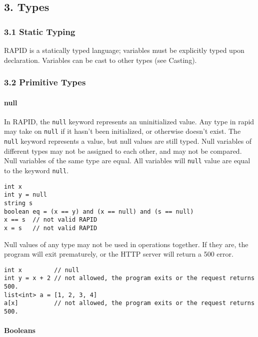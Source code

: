 \documentclass[]{article}
\begin{document}
\subsection{3. Types}\label{types}

\subsubsection{3.1 Static Typing}\label{static-typing}

RAPID is a statically typed language; variables must be explicitly typed
upon declaration. Variables can be cast to other types (see Casting).

\subsubsection{3.2 Primitive Types}\label{primitive-types}

\paragraph{null}\label{null}

In RAPID, the \texttt{null} keyword represents an uninitialized value.
Any type in rapid may take on \texttt{null} if it hasn't been
initialized, or otherwise doesn't exist. The \texttt{null} keyword
represents a value, but null values are still typed. Null variables of
different types may not be assigned to each other, and may not be
compared. Null variables of the same type are equal. All variables will
\texttt{null} value are equal to the keyword \texttt{null}.

\begin{verbatim}
int x
int y = null
string s
boolean eq = (x == y) and (x == null) and (s == null)
x == s  // not valid RAPID
x = s   // not valid RAPID
\end{verbatim}

Null values of any type may not be used in operations together. If they
are, the program will exit prematurely, or the HTTP server will return a
500 error.

\begin{verbatim}
int x         // null
int y = x + 2 // not allowed, the program exits or the request returns 500.
list<int> a = [1, 2, 3, 4]
a[x]          // not allowed, the program exits or the request returns 500.
\end{verbatim}

\paragraph{Booleans}\label{booleans}
\end{document}
